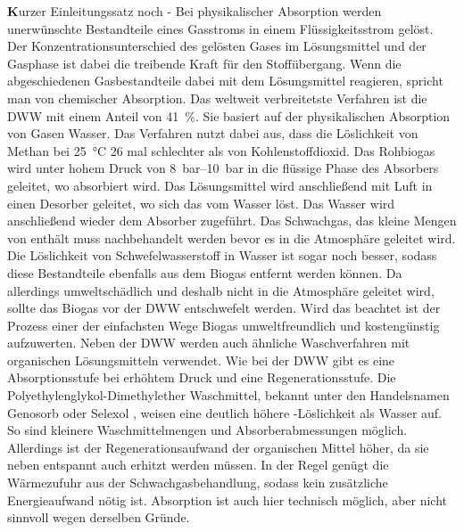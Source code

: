 {\textbf Kurzer Einleitungssatz noch -} Bei physikalischer Absorption werden unerwünschte Bestandteile eines Gasstroms in einem Flüssigkeitsstrom gelöst. Der Konzentrationsunterschied des gelösten Gases im Lösungsmittel und der Gasphase ist dabei die treibende Kraft für den Stoffübergang. Wenn die abgeschiedenen Gasbestandteile dabei mit dem Lösungsmittel reagieren, spricht man von chemischer Absorption. \parencite{Rasi09} \newline
Das weltweit verbreitetste Verfahren ist die \gls{DWW} mit einem Anteil von \SI{41}{\percent}. Sie basiert auf der physikalischen Absorption von Gasen Wasser. Das Verfahren nutzt dabei aus, dass die Löslichkeit von Methan bei \SI{25}{\degreeCelsius} \SI{26}{\relax} mal schlechter als von Kohlenstoffdioxid. Das Rohbiogas wird unter hohem Druck von \SIrange{8}{10}{\bar} in die flüssige Phase des Absorbers geleitet, wo  absorbiert wird. Das Lösungsmittel wird anschließend mit Luft in einen Desorber geleitet, wo sich das  vom Wasser löst. Das Wasser wird anschließend wieder dem Absorber zugeführt. Das Schwachgas, das kleine Mengen von  enthält muss nachbehandelt werden bevor es in die Atmosphäre geleitet wird.
Die Löslichkeit von Schwefelwasserstoff  in Wasser ist sogar noch besser, sodass diese Bestandteile ebenfalls aus dem Biogas entfernt werden können. Da  allerdings umweltschädlich und deshalb nicht in die Atmosphäre geleitet wird, sollte das Biogas vor der \gls{DWW} entschwefelt werden. Wird das beachtet ist der Prozess einer der einfachsten Wege Biogas umweltfreundlich und kostengünstig aufzuwerten. \parencite{KGKK2019} \parencite{BHPT13} \newline
Neben der \gls{DWW} werden auch ähnliche Waschverfahren mit organischen Lösungsmitteln verwendet. Wie bei der \gls{DWW} gibt es eine Absorptionsstufe bei erhöhtem Druck und eine Regenerationsstufe. Die Polyethylenglykol-Dimethylether Waschmittel, bekannt unter den Handelsnamen Genosorb \textsuperscript{\textregistered} oder Selexol \textsuperscript{\textregistered}, weisen eine deutlich höhere -Löslichkeit als Wasser auf. So sind kleinere Waschmittelmengen und Absorberabmessungen möglich. Allerdings ist der Regenerationsaufwand der organischen Mittel höher, da sie neben entspannt auch erhitzt werden müssen. In der Regel genügt die Wärmezufuhr aus der Schwachgasbehandlung, sodass kein zusätzliche Energieaufwand nötig ist.  Absorption ist auch hier technisch möglich, aber nicht sinnvoll wegen derselben Gründe. \parencite{FNR14} \newline
